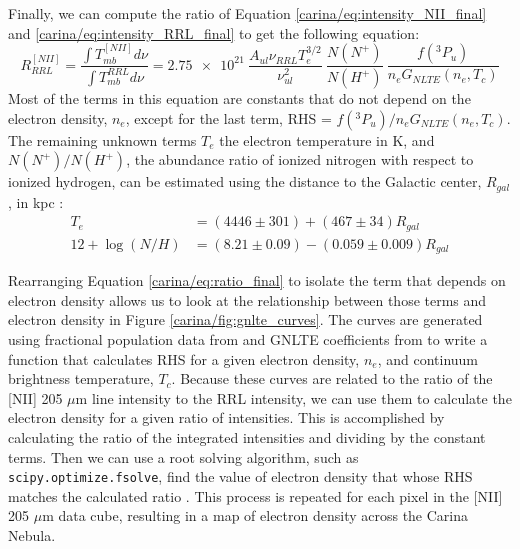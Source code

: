 Finally, we can compute the ratio of Equation \ref{carina/eq:intensity_NII_final} and \ref{carina/eq:intensity_RRL_final} to get the following equation:
\begin{equation}
    R^{[NII]}_{RRL} = \frac{\int{T^{[NII]}_{mb} d\nu}}{\int{T^{RRL}_{mb} d\nu}} = \num{2.75e21}\ \frac{A_{ul}\nu_{RRL}T_e^{3/2}}{\nu_{ul}^2}\ \frac{N(N^+)}{N(H^+)}\ \frac{f(^3P_u)}{n_e G_{NLTE}(n_e,T_c)}
    \label{carina/eq:ratio_final}
\end{equation}
Most of the terms in this equation are constants that do not depend on the electron density, $n_e$, except for the last term, RHS = $f(^3P_u)/n_e G_{NLTE}(n_e,T_c)$.
The remaining unknown terms $T_e$ the electron temperature in K, and $N(N^+)/N(H^+)$, the abundance ratio of ionized nitrogen with respect to ionized hydrogen, can be estimated using the distance to the Galactic center, $R_{gal}$, in kpc \parencite{pineda2019electron, balser2015azimuthal, esteban2018revisiting}:
\begin{align}
    T_e &= (4446 \pm 301) + (467 \pm 34) R_{gal} \\
    12 + \log(N/H) &= (8.21 \pm 0.09) - (0.059 \pm 0.009) R_{gal}
\end{align}

Rearranging Equation \ref{carina/eq:ratio_final} to isolate the term that depends on electron density allows us to look at the relationship between those terms and electron density in Figure \ref{carina/fig:gnlte_curves}.
The curves are generated using fractional population data from \cite{luridiana2015pyneb} and GNLTE coefficients from \cite{gordon2002radio} to write a function that calculates RHS for a given electron density, $n_e$, and continuum brightness temperature, $T_c$.
Because these curves are related to the ratio of the [NII] 205 $\mu$m line intensity to the RRL intensity, we can use them to calculate the electron density for a given ratio of intensities.
This is accomplished by calculating the ratio of the integrated intensities and dividing by the constant terms. 
Then we can use a root solving algorithm, such as \texttt{scipy.optimize.fsolve}, find the value of electron density that whose RHS matches the calculated ratio \parencite{2020SciPy-NMeth}.
This process is repeated for each pixel in the [NII] 205 $\mu$m data cube, resulting in a map of electron density across the Carina Nebula.

